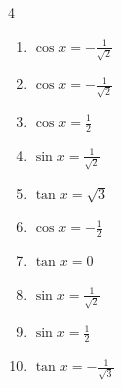 \begin{multicols}{4}
\begin{enumerate}

  \item $\displaystyle \cos{x}  = -\frac{1}{\sqrt{2}}$


  \item $\displaystyle \cos{x}  = -\frac{1}{\sqrt{2}}$


  \item $\displaystyle \cos{x}  = \frac{1}{2}$


  \item $\displaystyle \sin{x}  = \frac{1}{\sqrt{2}}$


  \item $\displaystyle \tan{x}  = \sqrt{3}$


  \item $\displaystyle \cos{x}  = -\frac{1}{2}$


  \item $\displaystyle \tan{x}  = 0$

        \phantom{$\displaystyle x = 0 , \pi$}

  \item $\displaystyle \sin{x}  = \frac{1}{\sqrt{2}}$


  \item $\displaystyle \sin{x}  = \frac{1}{2}$


  \item $\displaystyle \tan{x}  = -\frac{1}{\sqrt{3}}$


\columnbreak %

\resetques


\end{enumerate}
\end{multicols}
